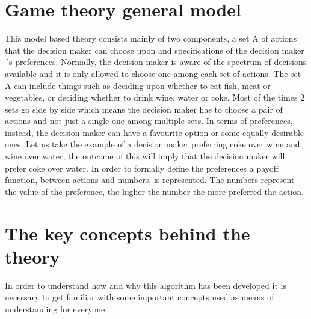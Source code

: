 \documentclass[conference]{IEEEtran}
\begin{document}
\section{Game theory general model}
This model based theory consists mainly of two components, a set A of actions that the decision maker can choose upon and specifications of the decision maker´s preferences. Normally, the decision maker is aware of the spectrum of decisions available and it is only allowed to choose one among each set of actions. The set A can include things such as deciding upon whether to eat fish, meat or vegetables, or deciding whether to drink wine, water or coke. Most of the times 2 sets go side by side which means the decision maker has to choose a pair of actions and not just a single one among multiple sets. In terms of preferences, instead, the decision maker can have a favourite option or some equally desirable ones. Let us take the example of a decision maker preferring coke over wine and wine over water, the outcome of this will imply that the decision maker will prefer coke over water. In order to formally define the preferences a payoff function, between actions and numbers, is represented. The numbers represent the value of the preference, the higher the number the more preferred the action.

\section{The key concepts behind the theory}
In order to understand how and why this algorithm has been developed it is necessary to get familiar with some important concepts used as means of understanding for everyone.
\end{document}
